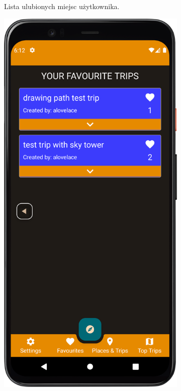 \begin{figure}[H]
\begin{subfigure}[b]{0.3\textwidth}
                \caption{Lista ulubionych miejsc użytkownika.\label{fav_place}}
            \end{subfigure}
            \hfill
            \begin{subfigure}[b]{0.3\textwidth}
                \centering
                \includegraphics[width=\textwidth]{src/app/fav_trips1.png}

\end{subfigure}
\end{figure}
